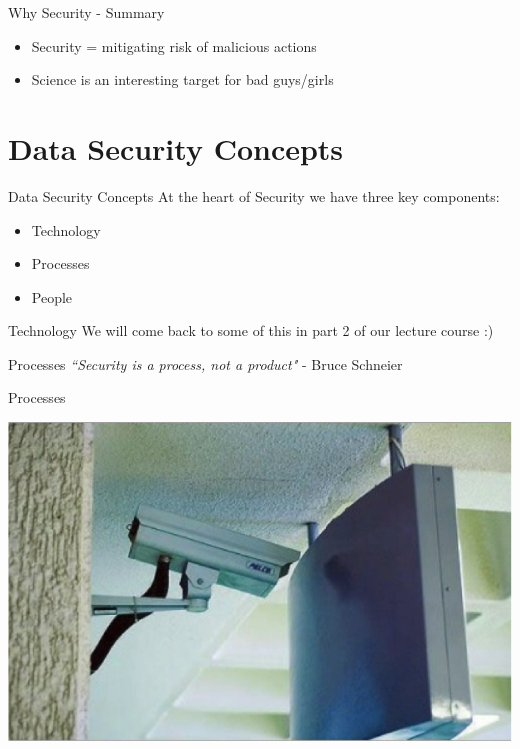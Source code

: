 \documentclass{beamer}
\begin{document}
\begin{frame}{Why Security - Summary}
\begin{itemize}
\item Security = mitigating risk of malicious actions
\item Science is an interesting target for bad guys/girls
\end{itemize}
\end{frame}

\section{Data Security Concepts}
\frame{\sectionpage}

\begin{frame}{Data Security Concepts}
At the heart of Security we have three key components:
	\begin{itemize}
		\item Technology
		\item Processes
        \item People
	\end{itemize}
\end{frame}

\begin{frame}{Technology}
We will come back to some of this in part 2 of our lecture course :) 
\end{frame}

\begin{frame}{Processes}
\textit{``Security is a process, not a product"} - Bruce Schneier
\end{frame}

\begin{frame}{Processes}
\begin{center}
\includegraphics[width=0.8\linewidth]{process1.png} 
\end{center}
\end{frame}
\end{document}
